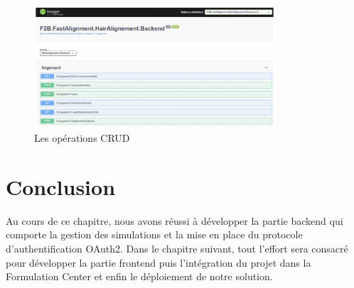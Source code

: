 \begin{figure}[!ht]\centering
\includegraphics[width=0.8\textwidth]{chapitres/chapitre4/figures/crud.png}
\caption{Les opérations CRUD}
\label{fig:crud}
\end{figure}


\section*{Conclusion}
Au cours de ce chapitre, nous avons réussi à développer la partie backend qui comporte la gestion des simulations et la mise en place du protocole d’authentification OAuth2. Dans le chapitre suivant, tout l’effort sera consacré pour développer la partie frontend puis l’intégration du projet dans la Formulation Center et enfin le déploiement de notre solution.


